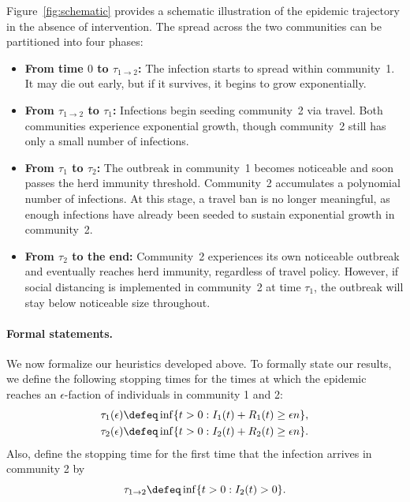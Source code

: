 \documentclass[11pt]{article}
\begin{document}
Figure~\ref{fig:schematic} provides a schematic illustration of the epidemic trajectory in the absence of intervention. The spread across the two communities can be partitioned into four phases:
\begin{itemize}
    \item \textbf{From time $0$ to $\tau_{1 \to 2}$:}  
    The infection starts to spread within community~1. It may die out early, but if it survives, it begins to grow exponentially.

    \item \textbf{From $\tau_{1 \to 2}$ to $\tau_1$:}  
    Infections begin seeding community~2 via travel. Both communities experience exponential growth, though community~2 still has only a small number of infections.

    \item \textbf{From $\tau_1$ to $\tau_2$:}  
    The outbreak in community~1 becomes noticeable and soon passes the herd immunity threshold. Community~2 accumulates a polynomial number of infections. At this stage, a travel ban is no longer meaningful, as enough infections have already been seeded to sustain exponential growth in community~2.

    \item \textbf{From $\tau_2$ to the end:}  
    Community~2 experiences its own noticeable outbreak and eventually reaches herd immunity, regardless of travel policy. However, if social distancing is implemented in community~2 at time $\tau_1$, the outbreak will stay below noticeable size throughout.
\end{itemize}





\paragraph{Formal statements.}
We now formalize our heuristics developed above. To formally state our results, we define the following stopping times for the times at which the epidemic reaches an $\epsilon$-faction of individuals in community 1 and 2:
\begin{align}
    \tau_1(\epsilon) &\defeq \inf \{t>0 : I_1(t) +R_1(t)\geq \epsilon n\}, \label{eqn:tau1def}\\
    \tau_2(\epsilon) &\defeq \inf \{t>0 : I_2(t) +R_2(t) \geq \epsilon n\}.\label{eqn:tau2def}
\end{align}
Also, define the stopping time for the first time that the infection arrives in community 2 by
\begin{equation}\label{eqn:tau1to2def}
    \tau_{1\to 2} \defeq \inf \{t > 0: I_2(t) > 0\}.
\end{equation}
\end{document}
